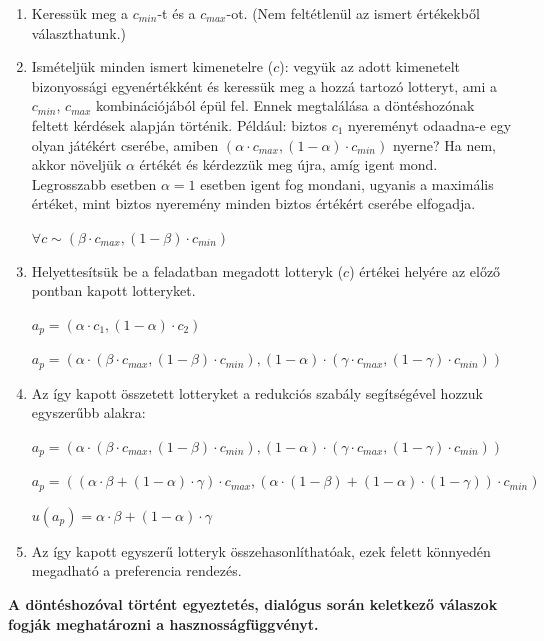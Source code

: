 \documentclass[a4paper,12pt]{article}
\begin{document}
\begin{enumerate}
\item Keressük meg a $c_{min}$-t és a $c_{max}$-ot. (Nem feltétlenül az ismert értékekből választhatunk.)
\item Ismételjük minden ismert kimenetelre ($c$): vegyük az adott kimenetelt bizonyossági egyenértékként és keressük meg a hozzá tartozó lotteryt, ami a $c_{min}$, $c_{max}$ kombinációjából épül fel. Ennek megtalálása a döntéshozónak feltett kérdések alapján történik. Például: biztos $c_1$ nyereményt odaadna-e egy olyan játékért cserébe, amiben $(\alpha \cdot c_{max}, (1-\alpha) \cdot c_{min} )$ nyerne? Ha nem, akkor növeljük $\alpha$ értékét és kérdezzük meg újra, amíg igent mond. Legrosszabb esetben $\alpha = 1$ esetben igent fog mondani, ugyanis a maximális értéket, mint biztos nyeremény minden biztos értékért cserébe elfogadja.

$\forall c \sim  (\beta \cdot c_{max},(1-\beta)\cdot c_{min})$
\item Helyettesítsük be a feladatban megadott lotteryk ($c$) értékei helyére az előző pontban kapott lotteryket. 

$a_p = (\alpha \cdot c_1, (1-\alpha) \cdot c_2 ) $

$a_p = (\alpha\cdot(\beta \cdot c_{max},(1-\beta)\cdot c_{min}), (1-\alpha) \cdot(\gamma\cdot c_{max},(1-\gamma)\cdot c_{min})) $

\item Az így kapott összetett lotteryket a redukciós szabály segítségével hozzuk egyszerűbb alakra: 

$a_p = (\alpha\cdot(\beta \cdot c_{max},(1-\beta)\cdot c_{min}), (1-\alpha) \cdot(\gamma\cdot c_{max},(1-\gamma)\cdot c_{min}) )$

$a_p = ((\alpha \cdot \beta + (1-\alpha) \cdot \gamma) \cdot c_{max} , (\alpha \cdot (1-\beta) + (1-\alpha) \cdot (1-\gamma) ) \cdot c_{min} ) $

$u(a_p) = \alpha \cdot \beta + (1-\alpha) \cdot \gamma$


\item Az így kapott egyszerű lotteryk összehasonlíthatóak, ezek felett könnyedén megadható a preferencia rendezés.
\end{enumerate}

\textbf{A döntéshozóval történt egyeztetés, dialógus során keletkező válaszok fogják meghatározni a hasznosságfüggvényt.}
\end{document}
